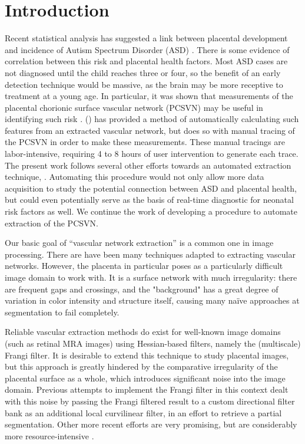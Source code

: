 \chapter{Introduction} \label{ch:introduction}

Recent statistical analysis has suggested a link between placental development and incidence of
Autism Spectrum Disorder (ASD) \autocite{chang2017}. There is some evidence \autocite{chang2016whole}
of correlation between this risk and placental health factors. Most ASD
cases are not diagnosed until the child reaches three or four, so the benefit
of an early detection technique would be massive, as the brain may be more
receptive to treatment at a young age. In particular, it was shown that measurements of the placental chorionic surface
vascular network (PCSVN) may be useful in identifying such risk
\autocite{chang2016whole}.
\citeauthor{chang2017} (\citeyear{chang2017}) has provided a method of automatically calculating such
features from an extracted vascular network, but does so with manual tracing of
the PCSVN in order to make these measurements.  These manual tracings are
labor-intensive, requiring 4 to 8 hours of user intervention to generate each trace.
The present work follows several other efforts towards an automated extraction
technique, \autocite{almoussa-ucla-reu,huynh2013filter,djima2017enhancing}.
Automating this procedure would not
only allow more data acquisition to study the potential connection between ASD
and placental health, but could even potentially serve as the basis of real-time
diagnostic for neonatal risk factors as well. We continue the work of
developing a procedure to automate extraction of the PCSVN.


Our basic goal of ``vascular network extraction'' is a common one in image
processing. There are have been many techniques adapted to extracting vascular
networks. However, the placenta in particular poses as a particularly difficult
image domain to work with. It is a surface network with much irregularity: there are
frequent gaps and crossings, and the "background" has a great degree of variation in
color intensity and structure itself, causing many na\"{i}ve
approaches at segmentation to fail completely.

Reliable vascular extraction methods do exist for well-known image domains
(such as retinal MRA images) using Hessian-based filters, namely the (multiscale) Frangi filter.
It is desirable to extend this technique to study placental images, but this
approach is greatly hindered by the comparative irregularity of the placental
surface as a whole, which introduces significant noise into the image domain.
Previous attempts to implement the Frangi filter in this context \autocite{huynh2013filter}
dealt with this noise by passing the Frangi filtered result to a custom directional filter bank
as an additional local curvilinear filter, in an effort to retrieve a partial
segmentation. Other more recent efforts are very promising,
but are considerably more resource-intensive \autocite{djima2017enhancing}.

